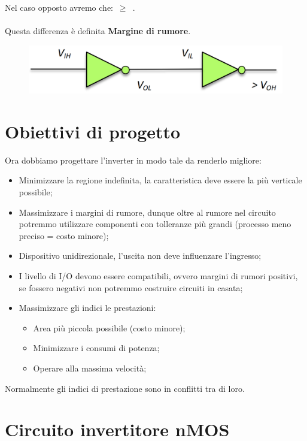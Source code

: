 Nel caso opposto avremo che: \voh $\,\geq\,$ \vih. 

\paragraph{}
Questa differenza è definita \textbf{Margine di rumore}.


\begin{figure}[htbp]
    \centering
    \includegraphics[width=0.45\linewidth]{img/cascata.png}    
    
\end{figure}

\newpage
\section{Obiettivi di progetto}
Ora dobbiamo progettare l'inverter in modo tale da renderlo migliore:

\begin{itemize}
    \item Minimizzare la regione indefinita, la caratteristica deve essere la più verticale possibile;
    \item Massimizzare i margini di rumore, dunque oltre al rumore nel circuito potremmo utilizzare componenti con tolleranze più grandi (processo meno preciso = costo minore);
    \item Dispositivo unidirezionale, l'uscita non deve influenzare l'ingresso; 
    \item I livello di I/O devono essere compatibili, ovvero margini di rumori positivi, se fossero negativi non potremmo costruire circuiti in casata;
    \item Massimizzare gli indici le prestazioni:
    \begin{itemize}
        \item Area più piccola possibile (costo minore);
        \item Minimizzare i consumi di potenza;
        \item Operare alla massima velocità;
    \end{itemize}
\end{itemize}

Normalmente gli indici di prestazione sono in conflitti tra di loro.

\section{Circuito invertitore nMOS}

